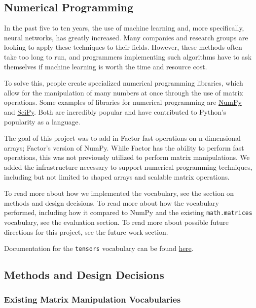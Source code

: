 \documentclass[
]{article}
\begin{document}
\hypertarget{numerical-programming}{%
\subsection{Numerical Programming}\label{numerical-programming}}

In the past five to ten years, the use of machine learning and, more
specifically, neural networks, has greatly increased. Many companies and
research groups are looking to apply these techniques to their fields.
However, these methods often take too long to run, and programmers
implementing such algorithms have to ask themselves if machine learning
is worth the time and resource cost.

To solve this, people create specialized numerical programming
libraries, which allow for the manipulation of many numbers at once
through the use of matrix operations. Some examples of libraries for
numerical programming are \href{https://numpy.org/}{NumPy} and
\href{https://www.scipy.org/}{SciPy}. Both are incredibly popular and
have contributed to Python's popularity as a language.

The goal of this project was to add in Factor fast operations on
n-dimensional arrays; Factor's version of NumPy. While Factor has the
ability to perform fast operations, this was not previously utilized to
perform matrix manipulations. We added the infrastructure necessary to
support numerical programming techniques, including but not limited to
shaped arrays and scalable matrix operations.

To read more about how we implemented the vocabulary, see the section on
methods and design decisions. To read more about how the vocabulary
performed, including how it compared to NumPy and the existing
\texttt{math.matrices} vocabulary, see the evaluation section. To read
more about possible future directions for this project, see the future
work section.

Documentation for the \texttt{tensors} vocabulary can be found
\href{https://docs.factorcode.org/content/article-tensors.html}{here}.

\hypertarget{methods-and-design-decisions}{%
\subsection{Methods and Design
Decisions}\label{methods-and-design-decisions}}

\hypertarget{existing-matrix-manipulation-vocabularies}{%
\subsubsection{Existing Matrix Manipulation
Vocabularies}\label{existing-matrix-manipulation-vocabularies}}
\end{document}
